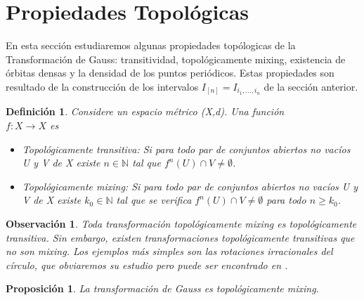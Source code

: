 \documentclass[12pt]{report}
\newtheorem{obs}{{Observación}}[section]
\newtheorem{defi}{Definición}[section]
\newtheorem{prop}{Proposición}[section]
\begin{document}
\section{Propiedades Topológicas}
En esta sección estudiaremos algunas propiedades topólogicas de la Transformación de Gauss: transitividad, topológicamente mixing, existencia de órbitas densas y la densidad de los puntos periódicos. Estas propiedades son resultado de la construcción de los intervalos $I_{[n]}=I_{i_{1},\ldots,i_{n}}$ de la sección anterior.

\begin{defi}
Considere un espacio métrico (X,d). Una función \\$f: X\rightarrow X$ es
\begin{itemize}
    \item Topológicamente transitiva: Si para todo par de conjuntos abiertos no vacíos U y V de X existe $n \in \mathbb{N}$ tal que $f^{n}(U)\cap V\neq\emptyset$.
    \item Topológicamente mixing: Si para todo par de conjuntos abiertos no vacíos U y V de X existe $k_{0}\in \mathbb{N}$ tal que se verifica $f^{n}(U)\cap V\neq\emptyset$ para todo $n\geq k_{0}$.
\end{itemize}

\end{defi}

\begin{obs}
Toda transformación topológicamente mixing es topológicamente transitiva. Sin embargo, existen transformaciones topológicamente transitivas que no son mixing. Los ejemplos más simples son las rotaciones irracionales del círculo, que obviaremos su estudio pero puede ser encontrado en \cite{Portugues}.
\end{obs}



\begin{prop}
La transformación de Gauss es topológicamente mixing.
\end{prop}
\end{document}
